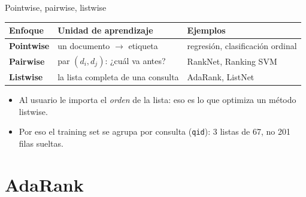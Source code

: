 \documentclass{beamer}
\newcommand{\code}[1]{\texttt{#1}}
\begin{document}
\begin{frame}{Pointwise, pairwise, listwise}
    \centering\small
    \begin{tabular}{>{\bfseries}l p{3.4cm} p{3.6cm}}
        \toprule
        Enfoque & Unidad de aprendizaje & Ejemplos \\
        \midrule
        Pointwise & un documento $\rightarrow$ etiqueta & regresión, clasificación ordinal \\
        Pairwise & par $(d_i,d_j)$: ¿cuál va antes? & RankNet, Ranking SVM \\
        Listwise & la lista completa de una consulta & \alert{AdaRank}, ListNet \\
        \bottomrule
    \end{tabular}
    \vspace{8pt}
    \begin{itemize}
        \item Al usuario le importa el \emph{orden} de la lista: eso es lo que optimiza un método listwise.
        \item Por eso el training set se agrupa por consulta (\code{qid}): 3 listas de 67, no 201 filas sueltas.
    \end{itemize}

\end{frame}


\section{AdaRank}
\end{document}
